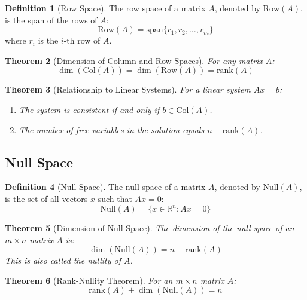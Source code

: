 \documentclass[12pt,a4paper]{article}
\theoremstyle{plain}
\newtheorem{theorem}{Theorem}[section]
\theoremstyle{definition}
\newtheorem{definition}[theorem]{Definition}
\begin{document}
\begin{definition}[Row Space]
The row space of a matrix $A$, denoted by $\text{Row}(A)$, is the span of the rows of $A$:
\begin{equation}
\text{Row}(A) = \text{span}\{r_1, r_2, \ldots, r_m\}
\end{equation}
where $r_i$ is the $i$-th row of $A$.
\end{definition}

\begin{theorem}[Dimension of Column and Row Spaces]
For any matrix $A$:
\begin{equation}
\dim(\text{Col}(A)) = \dim(\text{Row}(A)) = \text{rank}(A)
\end{equation}
\end{theorem}

\begin{theorem}[Relationship to Linear Systems]
For a linear system $Ax = b$:
\begin{enumerate}[label=(\roman*)]
\item The system is consistent if and only if $b \in \text{Col}(A)$.
\item The number of free variables in the solution equals $n - \text{rank}(A)$.
\end{enumerate}
\end{theorem}

\subsection{Null Space}

\begin{definition}[Null Space]
The null space of a matrix $A$, denoted by $\text{Null}(A)$, is the set of all vectors $x$ such that $Ax = 0$:
\begin{equation}
\text{Null}(A) = \{x \in \mathbb{R}^n : Ax = 0\}
\end{equation}
\end{definition}

\begin{theorem}[Dimension of Null Space]
The dimension of the null space of an $m \times n$ matrix $A$ is:
\begin{equation}
\dim(\text{Null}(A)) = n - \text{rank}(A)
\end{equation}
This is also called the nullity of $A$.
\end{theorem}

\begin{theorem}[Rank-Nullity Theorem]
For an $m \times n$ matrix $A$:
\begin{equation}
\text{rank}(A) + \dim(\text{Null}(A)) = n
\end{equation}
\end{theorem}
\end{document}

